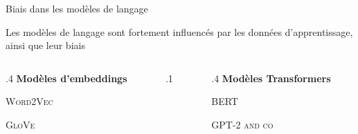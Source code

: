 \begin{frame}{Biais dans les modèles de langage}

    \begin{block}{}
        \medskip
        Les modèles de langage sont fortement influencés par les données d'apprentissage, ainsi que leur biais
    \end{block}

    \bigskip
    \hrulefill
    \bigskip

    \begin{columns}
        \begin{column}{.4\textwidth}
            \centering
            \textbf{Modèles d'embeddings}

            \medskip

            \textsc{Word2Vec}

            \textsc{GloVe}
        \end{column}

        \begin{column}{.1\textwidth}
        \end{column}

        \begin{column}{.4\textwidth}
            \centering
            \textbf{Modèles Transformers}

            \medskip

            \textsc{BERT}

            \textsc{GPT-2 and co}
        \end{column}
    \end{columns}

\end{frame}



